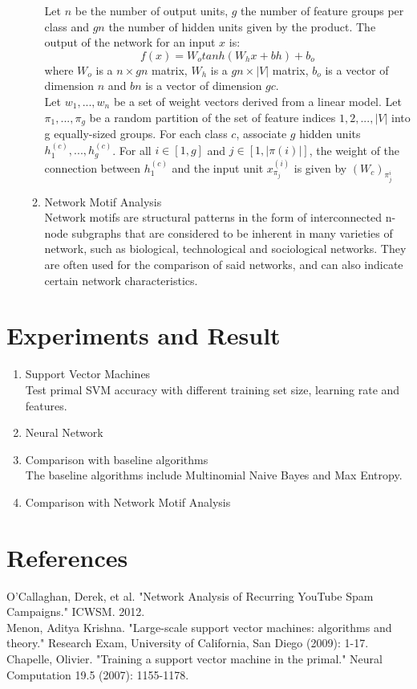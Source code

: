 \documentclass [a4paper, 11pt, oneside, final]{article}
\numberwithin{equation}{section}		%
\numberwithin{figure}{section}			%
\numberwithin{table}{section}				%
\begin{document}
\begin{enumerate}
\begin{enumerate}
Let $n$ be the number of output units, $g$ the number of feature groups per class and $gn$ the number of hidden units given by the product.
The output of the network for an input $x$ is:
$$ f(x) = W_{o}tanh(W_{h}x + bh) + b_{o}$$ where $W_{o}$ is a $n \times gn$ matrix, $W_{h}$ is a $gn \times |V|$ matrix, $b_{o}$ is a vector of dimension
$n$ and $bn$ is a vector of dimension $gc$.\\
Let ${w_{1}, . . . , w_{n}}$ be a set of weight vectors derived from a linear model. Let ${\pi_{1}, . . . , \pi_{g}}$ be a random partition of the set of feature indices ${1, 2, . . . , |V |}$  into g equally-sized groups. For each class $c$, associate $g$ hidden units ${h_{1}^{(c)}, . . . , h_{g}^{(c)}}$.
 For all $i \in [1, g]$ and $j \in [1, |\pi(i) |]$, the weight of the connection between $h_{1}^{(c)}$ and the input unit $x_{\pi_{j}}^{(i)} $ is given by $(W_{c})_{\pi_{j}^{i}}$


\item Network Motif Analysis \\
Network motifs are structural patterns in the form of interconnected n-node subgraphs that are considered to be inherent in many varieties of network, such as biological, technological and sociological networks. They are often used for the comparison of said networks, and can also indicate certain network characteristics.
\end{enumerate}
 
\end{enumerate}

\section{Experiments and Result}
\begin{enumerate}
\item Support Vector Machines \\
Test primal SVM accuracy with different training set size, learning rate and features.
\item Neural Network \\
\item Comparison with baseline algorithms \\
The baseline algorithms include Multinomial Naive Bayes and Max Entropy.
\item Comparison with Network Motif Analysis 
\end{enumerate}

\section{References}
\noindent O'Callaghan, Derek, et al. "Network Analysis of Recurring YouTube Spam Campaigns." ICWSM. 2012.\\
\noindent Menon, Aditya Krishna. "Large-scale support vector machines: algorithms and theory." Research Exam, University of California, San Diego (2009): 1-17.\\
\noindent Chapelle, Olivier. "Training a support vector machine in the primal." Neural Computation 19.5 (2007): 1155-1178.\\
\end{document}
